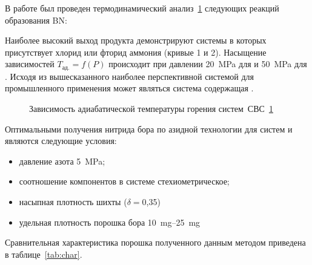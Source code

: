В работе \cite{amosov2007azidnaa} был проведен термодинамический анализ~\ref{fig:BN-SHS} следующих
реакций образования BN:


Наиболее высокий выход продукта демонстрируют системы в которых присутствует 
хлорид или фторид аммония (кривые 1 и 2). Насыщение зависимостей $T_\text{ад.} = f(P)$
происходит при давлении \SI{20}{\mega\pascal}  для  и \SI{50}{\mega\pascal}
для . Исходя из вышесказанного наиболее перспективной системой для промышленного
применения может являться система содержащая .

\begin{figure}[ht]
    \caption{Зависимость адиабатической температуры горения систем~СВС~\ref{fig:BN-SHS}}
    \label{fig:BN-SHS}
\end{figure}

Оптимальными получения нитрида бора по азидной технологии для систем 
 и  являются следующие условия:
 
\begin{itemize}
    \item давление азота \SI{5}{\mega\pascal};
    \item соотношение компонентов в системе стехиометрическое; 
    \item насыпная плотность шихты ($\delta=$0,35)
    \item удельная плотность порошка бора \SIrange{10}{25}{\milli\gram} 
 \end{itemize}

 Сравнительная характеристика порошка  полученного данным методом приведена
 в таблице~\ref{tab:char}.

